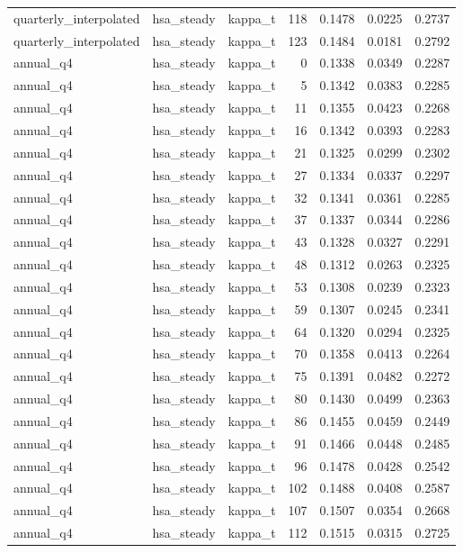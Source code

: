 \begin{tabular}{lllrrrr}
quarterly\_interpolated & hsa\_steady & kappa\_t & 118 & 0.1478 & 0.0225 & 0.2737 \\
quarterly\_interpolated & hsa\_steady & kappa\_t & 123 & 0.1484 & 0.0181 & 0.2792 \\
annual\_q4 & hsa\_steady & kappa\_t & 0 & 0.1338 & 0.0349 & 0.2287 \\
annual\_q4 & hsa\_steady & kappa\_t & 5 & 0.1342 & 0.0383 & 0.2285 \\
annual\_q4 & hsa\_steady & kappa\_t & 11 & 0.1355 & 0.0423 & 0.2268 \\
annual\_q4 & hsa\_steady & kappa\_t & 16 & 0.1342 & 0.0393 & 0.2283 \\
annual\_q4 & hsa\_steady & kappa\_t & 21 & 0.1325 & 0.0299 & 0.2302 \\
annual\_q4 & hsa\_steady & kappa\_t & 27 & 0.1334 & 0.0337 & 0.2297 \\
annual\_q4 & hsa\_steady & kappa\_t & 32 & 0.1341 & 0.0361 & 0.2285 \\
annual\_q4 & hsa\_steady & kappa\_t & 37 & 0.1337 & 0.0344 & 0.2286 \\
annual\_q4 & hsa\_steady & kappa\_t & 43 & 0.1328 & 0.0327 & 0.2291 \\
annual\_q4 & hsa\_steady & kappa\_t & 48 & 0.1312 & 0.0263 & 0.2325 \\
annual\_q4 & hsa\_steady & kappa\_t & 53 & 0.1308 & 0.0239 & 0.2323 \\
annual\_q4 & hsa\_steady & kappa\_t & 59 & 0.1307 & 0.0245 & 0.2341 \\
annual\_q4 & hsa\_steady & kappa\_t & 64 & 0.1320 & 0.0294 & 0.2325 \\
annual\_q4 & hsa\_steady & kappa\_t & 70 & 0.1358 & 0.0413 & 0.2264 \\
annual\_q4 & hsa\_steady & kappa\_t & 75 & 0.1391 & 0.0482 & 0.2272 \\
annual\_q4 & hsa\_steady & kappa\_t & 80 & 0.1430 & 0.0499 & 0.2363 \\
annual\_q4 & hsa\_steady & kappa\_t & 86 & 0.1455 & 0.0459 & 0.2449 \\
annual\_q4 & hsa\_steady & kappa\_t & 91 & 0.1466 & 0.0448 & 0.2485 \\
annual\_q4 & hsa\_steady & kappa\_t & 96 & 0.1478 & 0.0428 & 0.2542 \\
annual\_q4 & hsa\_steady & kappa\_t & 102 & 0.1488 & 0.0408 & 0.2587 \\
annual\_q4 & hsa\_steady & kappa\_t & 107 & 0.1507 & 0.0354 & 0.2668 \\
annual\_q4 & hsa\_steady & kappa\_t & 112 & 0.1515 & 0.0315 & 0.2725 \\

\end{tabular}
